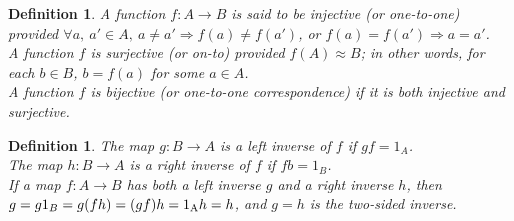 \documentclass[a4paper,sfsidenotes,openany]{tufte-book}
\theoremstyle{theorem}
\newtheorem{definition}[theorem]{Definition}
\begin{document}
\begin{fullwidth}
\begin{definition}
A function $ f: A \rightarrow B$ is said to be \textit{{\color{blue} injective}} (or one-to-one) provided $ \forall a, \ a' \in A, \ a \neq a' \Rightarrow f(a) \neq f(a') $, or $ f(a) = f(a') \Rightarrow a = a'  $.\\
A function $ f $ is \textit{{\color{blue} surjective}} (or on-to) provided $ f(A) \approx B $; in other words, for each $ b \in B $, $ b=f(a) $ for some $ a \in A $.\\
A function $ f $ is \textit{{\color{blue} bijective}} (or one-to-one correspondence) if it is both injective and surjective.\\
\end{definition}
\>

\begin{definition}
The map $ g: B \rightarrow A $ is a \textit{{\color{blue} left inverse}} of $ f $ if $ gf = 1_A $.\\
The map $ h: B \rightarrow A $ is a \textit{{\color{blue} right inverse}} of $ f $ if $ fb = 1_B $.\\
If a map $ f: A \rightarrow B $ has both a left inverse $ g $ and a right inverse $ h $, then $ g = g1_B = g(fh) = (gf)h = 1 \textsubscript{A} h = h $, and $ g=h $ is the \textit{{\color{blue} two-sided inverse}}.\\
\end{definition}
\>

\end{fullwidth}


\newpage

\end{document}
